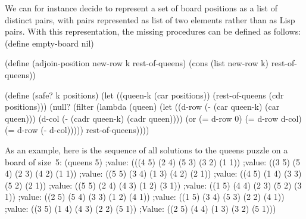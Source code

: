 We can for instance decide to represent a set of board positions as a list of distinct pairs, with pairs represented as list of two elements rather than as Lisp pairs.
With this representation, the missing procedures can be defined as follows:
\begtt\scm
(define empty-board nil)

(define (adjoin-position new-row k rest-of-queens)
  (cons (list new-row k) rest-of-queens))

(define (safe? k positions)
  (let ((queen-k (car positions))
        (rest-of-queens (cdr positions)))
    (null? (filter (lambda (queen)
                     (let ((d-row (- (car queen-k) (car queen)))
                           (d-col (- (cadr queen-k) (cadr queen))))
                       (or (= d-row 0)
                           (= d-row d-col)
                           (= d-row (- d-col)))))
                   rest-of-queens))))
\endtt

As an example, here is the sequence of all solutions to the queens puzzle on a board of size~5:
\begtt\scm
(queens 5)
;value: (((4 5) (2 4) (5 3) (3 2) (1 1))
;value:  ((3 5) (5 4) (2 3) (4 2) (1 1))
;value:  ((5 5) (3 4) (1 3) (4 2) (2 1))
;value:  ((4 5) (1 4) (3 3) (5 2) (2 1))
;value:  ((5 5) (2 4) (4 3) (1 2) (3 1))
;value:  ((1 5) (4 4) (2 3) (5 2) (3 1))
;value:  ((2 5) (5 4) (3 3) (1 2) (4 1))
;value:  ((1 5) (3 4) (5 3) (2 2) (4 1))
;value:  ((3 5) (1 4) (4 3) (2 2) (5 1))
;Value:  ((2 5) (4 4) (1 3) (3 2) (5 1)))
\endtt
